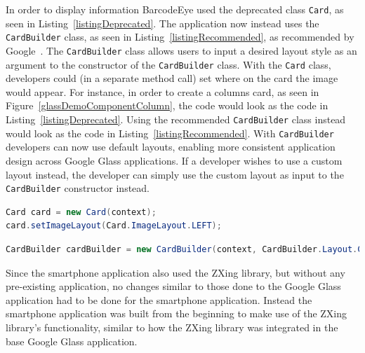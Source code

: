 In order to display information BarcodeEye used the deprecated class \texttt{Card}, as seen in Listing~\ref{listingDeprecated}. The application now instead uses the \texttt{CardBuilder} class, as seen in Listing~\ref{listingRecommended}, as recommended by Google~\cite{googleCard}. The \texttt{CardBuilder} class allows users to input a desired layout style as an argument to the constructor of the \texttt{CardBuilder} class. With the \texttt{Card} class, developers could (in a separate method call) set where on the card the image would appear. For instance, in order to create a columns card, as seen in Figure~\ref{glassDemoComponentColumn}, the code would look as the code in Listing~\ref{listingDeprecated}. Using the recommended \texttt{CardBuilder} class instead would look as the code in Listing~\ref{listingRecommended}. With \texttt{CardBuilder} developers can now use default layouts, enabling more consistent application design across Google Glass applications. If a developer wishes to use a custom layout instead, the developer can simply use the custom layout as input to the \texttt{CardBuilder} constructor instead.

\begin{lstlisting}[language=Java, caption={Instancing of the deprecated class Card}, label=listingDeprecated]
Card card = new Card(context);
card.setImageLayout(Card.ImageLayout.LEFT);
\end{lstlisting}

\begin{lstlisting}[language=Java, caption={Instancing of the recommended class CardBuilder}, label=listingRecommended]
CardBuilder cardBuilder = new CardBuilder(context, CardBuilder.Layout.COLUMNS);
\end{lstlisting}

Since the smartphone application also used the ZXing library, but without any pre-existing application, no changes similar to those done to the Google Glass application had to be done for the smartphone application. Instead the smartphone application was built from the beginning to make use of the ZXing library's functionality, similar to how the ZXing library was integrated in the base Google Glass application.



